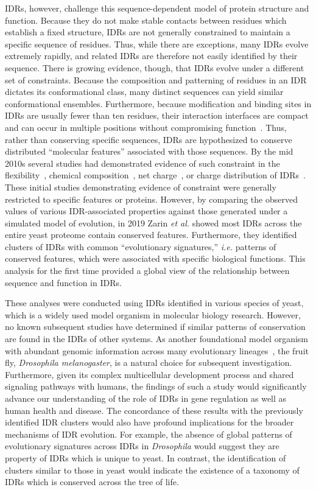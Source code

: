 IDRs, however, challenge this sequence-dependent model of protein structure and function. Because they do not make stable contacts between residues which establish a fixed structure, IDRs are not generally constrained to maintain a specific sequence of residues. Thus, while there are exceptions, many IDRs evolve extremely rapidly, and related IDRs are therefore not easily identified by their sequence. There is growing evidence, though, that IDRs evolve under a different set of constraints. Because the composition and patterning of residues in an IDR dictates its conformational class, many distinct sequences can yield similar conformational ensembles. Furthermore, because modification and binding sites in IDRs are usually fewer than ten residues, their interaction interfaces are compact and can occur in multiple positions without compromising function~\cite{Tompa2014}. Thus, rather than conserving specific sequences, IDRs are hypothesized to conserve distributed ``molecular features'' associated with those sequences. By the mid 2010s several studies had demonstrated evidence of such constraint in the flexibility~\cite{Daughdrill2007}, chemical composition~\cite{Moesa2012}, net charge~\cite{Zarin2017}, or charge distribution of IDRs~\cite{Beh2012}. These initial studies demonstrating evidence of constraint were generally restricted to specific features or proteins. However, by comparing the observed values of various IDR-associated properties against those generated under a simulated model of evolution, in 2019 Zarin \textit{et al.} showed most IDRs across the entire yeast proteome contain conserved features. Furthermore, they identified clusters of IDRs with common ``evolutionary signatures,'' \textit{i.e.} patterns of conserved features, which were associated with specific biological functions. This analysis for the first time provided a global view of the relationship between sequence and function in IDRs.

These analyses were conducted using IDRs identified in various species of yeast, which is a widely used model organism in molecular biology research. However, no known subsequent studies have determined if similar patterns of conservation are found in the IDRs of other systems. As another foundational model organism with abundant genomic information across many evolutionary lineages~\cite{Yang2018, Miller2018, Kim2021, Gramates2022}, the fruit fly, \textit{Drosophila melanogaster}, is a natural choice for subsequent investigation. Furthermore, given its complex multicellular development process and shared signaling pathways with humans, the findings of such a study would significantly advance our understanding of the role of IDRs in gene regulation as well as human health and disease. The concordance of these results with the previously identified IDR clusters would also have profound implications for the broader mechanisms of IDR evolution. For example, the absence of global patterns of evolutionary signatures across IDRs in \textit{Drosophila} would suggest they are property of IDRs which is unique to yeast. In contrast, the identification of clusters similar to those in yeast would indicate the existence of a taxonomy of IDRs which is conserved across the tree of life.

